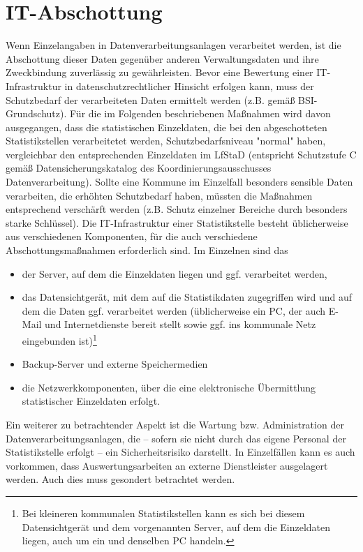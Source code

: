 \section{IT-Abschottung} \label{ITA}
Wenn Einzelangaben in Datenverarbeitungsanlagen verarbeitet werden, ist die Abschottung dieser Daten gegenüber anderen Verwaltungsdaten und ihre Zweckbindung zuverlässig zu gewährleisten. Bevor eine Bewertung einer IT-Infrastruktur in datenschutzrechtlicher Hinsicht erfolgen kann, muss der Schutzbedarf der verarbeiteten Daten ermittelt werden (z.B. gemäß BSI-Grundschutz). Für die im Folgenden beschriebenen Maßnahmen wird davon ausgegangen, dass die statistischen Einzeldaten, die bei den abgeschotteten Statistikstellen verarbeitetet werden, Schutzbedarfsniveau "normal" haben, vergleichbar den entsprechenden Einzeldaten im LfStaD (entspricht Schutzstufe C gemäß Datensicherungskatalog des Koordinierungsausschusses Datenverarbeitung). Sollte eine Kommune im Einzelfall besonders sensible Daten verarbeiten, die erhöhten Schutzbedarf haben, müssten die Maßnahmen entsprechend verschärft werden (z.B. Schutz einzelner Bereiche durch besonders starke Schlüssel).
Die IT-Infrastruktur einer Statistikstelle besteht üblicherweise aus verschiedenen Komponenten, für die auch verschiedene Abschottungsmaßnahmen erforderlich sind. Im Einzelnen sind das
    \begin{itemize}
        \item der Server, auf dem die Einzeldaten liegen und ggf. verarbeitet werden,
        \item das Datensichtgerät, mit dem auf die Statistikdaten zugegriffen wird und auf dem die Daten ggf. verarbeitet werden (üblicherweise ein PC, der auch E-Mail und Internetdienste bereit stellt sowie ggf. ins kommunale Netz eingebunden ist)\footnote{Bei kleineren kommunalen Statistikstellen kann es sich bei diesem Datensichtgerät und dem vorgenannten Server, auf dem die Einzeldaten liegen, auch um ein und denselben PC handeln.}
        \item Backup-Server und externe Speichermedien
        \item die Netzwerkkomponenten, über die eine elektronische Übermittlung statistischer Einzeldaten erfolgt.
    \end{itemize}
Ein weiterer zu betrachtender Aspekt ist die Wartung bzw. Administration der Datenverarbeitungsanlagen, die – sofern sie nicht durch das eigene Personal der Statistikstelle erfolgt – ein Sicherheitsrisiko darstellt. In Einzelfällen kann es auch vorkommen, dass Auswertungsarbeiten an externe Dienstleister ausgelagert werden. Auch dies muss gesondert betrachtet werden.

